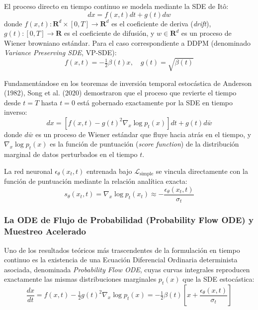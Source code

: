 El proceso directo en tiempo continuo se modela mediante la SDE de Itô:
\begin{equation}
dx = f(x, t) dt + g(t) dw
\end{equation}
donde $f(x, t): \mathbf{R}^d \times [0, T] \to \mathbf{R}^d$ es el coeficiente de deriva (\textit{drift}), $g(t): [0, T] \to \mathbf{R}$ es el coeficiente de difusión, y $w \in \mathbf{R}^d$ es un proceso de Wiener browniano estándar. Para el caso correspondiente a DDPM (denominado \textit{Variance Preserving SDE}, VP-SDE):
\begin{equation}
f(x, t) = -\tfrac{1}{2} \beta(t) x, \quad g(t) = \sqrt{\beta(t)}
\end{equation}

Fundamentándose en los teoremas de inversión temporal estocástica de Anderson (1982), Song et al. (2020) demostraron que el proceso que revierte el tiempo desde $t=T$ hasta $t=0$ está gobernado exactamente por la SDE en tiempo inverso:
\begin{equation}
dx = \left[ f(x, t) - g(t)^2 \nabla_x \log p_t(x) \right] dt + g(t) d\bar{w}
\end{equation}
donde $d\bar{w}$ es un proceso de Wiener estándar que fluye hacia atrás en el tiempo, y $\nabla_x \log p_t(x)$ es la función de puntuación (\textit{score function}) de la distribución marginal de datos perturbados en el tiempo $t$. 

La red neuronal $\epsilon_\theta(x_t, t)$ entrenada bajo $\mathcal{L}_{\mathrm{simple}}$ se vincula directamente con la función de puntuación mediante la relación analítica exacta:
\begin{equation}
s_\theta(x_t, t) = \nabla_x \log p_t(x_t) \approx - \frac{\epsilon_\theta(x_t, t)}{\sigma_t}
\end{equation}

\subsubsection{La ODE de Flujo de Probabilidad (Probability Flow ODE) y Muestreo Acelerado}

Uno de los resultados teóricos más trascendentes de la formulación en tiempo continuo es la existencia de una Ecuación Diferencial Ordinaria determinista asociada, denominada \textit{Probability Flow ODE}, cuyas curvas integrales reproducen exactamente las mismas distribuciones marginales $p_t(x)$ que la SDE estocástica:
\begin{equation}
\frac{dx}{dt} = f(x, t) - \tfrac{1}{2} g(t)^2 \nabla_x \log p_t(x) = -\tfrac{1}{2} \beta(t) \left[ x + \frac{\epsilon_\theta(x, t)}{\sigma_t} \right]
\end{equation}

